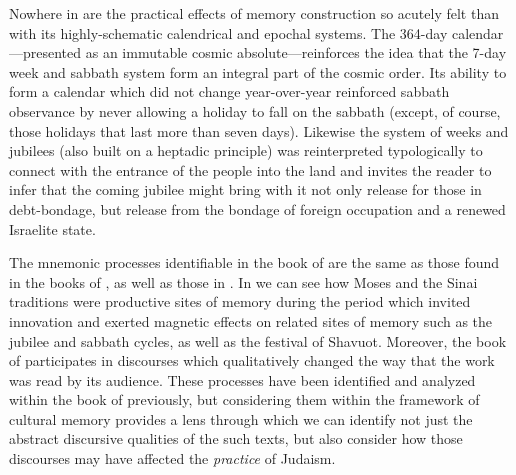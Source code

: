 Nowhere in \jub are the practical effects of memory construction so acutely felt than with its highly-schematic calendrical and epochal systems. The 364-day calendar---presented as an immutable cosmic absolute---reinforces the idea that the 7-day week and sabbath system form an integral part of the cosmic order. %
Its ability to form a calendar which did not change year-over-year reinforced sabbath observance by never allowing a holiday to fall on the sabbath (except, of course, those holidays that last more than seven days). Likewise the system of weeks and jubilees (also built on a heptadic principle) was reinterpreted typologically to connect with the entrance of the people into the land and invites the reader to infer that the coming jubilee might bring with it not only release for those in debt-bondage, but release from the bondage of foreign occupation and a renewed Israelite state.

The mnemonic processes identifiable in the book of \jub are the same as those found in the books of \chronicles, as well as those in \ga. In \jub we can see how Moses and the Sinai traditions were productive sites of memory during the \secondtemple period which invited innovation and exerted magnetic effects on related sites of memory such as the jubilee and sabbath cycles, as well as the festival of Shavuot. Moreover, the book of \jub participates in \psgraphical discourses which qualitatively changed the way that the work was read by its audience. These processes have been identified and analyzed within the book of \jub previously, but considering them within the framework of cultural memory provides a lens through which we can identify not just the abstract discursive qualities of the such texts, but also consider how those discourses may have affected the \emph{practice} of \secondtemple Judaism.
